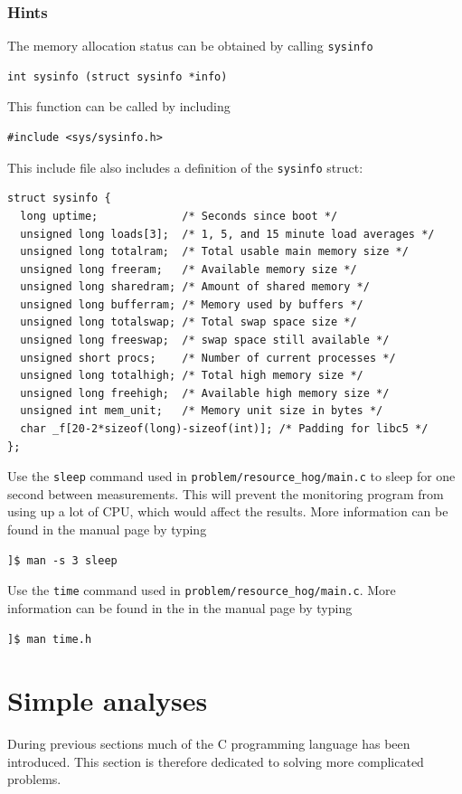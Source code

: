 \documentclass[11pt]{scrartcl}
\begin{document}
\subsubsection*{Hints}
The memory allocation status can be obtained by calling \texttt{sysinfo}
\begin{lstlisting}
int sysinfo (struct sysinfo *info)
\end{lstlisting}
This function can be called by including
\begin{lstlisting}
#include <sys/sysinfo.h>
\end{lstlisting}
This include file also includes a definition of the \texttt{sysinfo} struct:
\begin{lstlisting}
struct sysinfo {
  long uptime;             /* Seconds since boot */
  unsigned long loads[3];  /* 1, 5, and 15 minute load averages */
  unsigned long totalram;  /* Total usable main memory size */
  unsigned long freeram;   /* Available memory size */
  unsigned long sharedram; /* Amount of shared memory */
  unsigned long bufferram; /* Memory used by buffers */
  unsigned long totalswap; /* Total swap space size */
  unsigned long freeswap;  /* swap space still available */
  unsigned short procs;    /* Number of current processes */
  unsigned long totalhigh; /* Total high memory size */
  unsigned long freehigh;  /* Available high memory size */
  unsigned int mem_unit;   /* Memory unit size in bytes */
  char _f[20-2*sizeof(long)-sizeof(int)]; /* Padding for libc5 */
};
\end{lstlisting}
%
Use the \texttt{sleep} command used in
\texttt{problem/resource\_hog/main.c} to sleep for one second between
measurements.  This will prevent the monitoring program from using
up a lot of CPU, which would affect the results.  More information can
be found in the manual page by typing
\begin{verbatim}
]$ man -s 3 sleep
\end{verbatim} %
%
Use the \texttt{time} command used in
\texttt{problem/resource\_hog/main.c}.  More information can be found
in the in the manual page by typing
\begin{verbatim}
]$ man time.h
\end{verbatim} %

\clearpage
\newpage

\section{Simple analyses}
During previous sections much of the C programming language has been
introduced.  This section is therefore dedicated to solving more
complicated problems.
\end{document}
